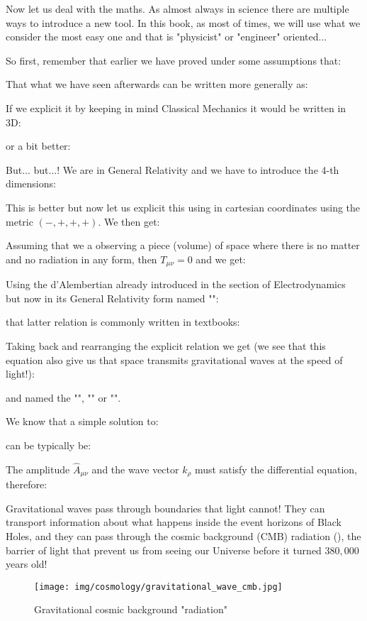 	Now let us deal with the maths. As almost always in science there are multiple ways to introduce a new tool. In this book, as most of times, we will use what we consider the most easy one and that is "physicist" or "engineer" oriented...
	
	So first, remember that earlier we have proved under some assumptions that:
	
	That what we have seen afterwards can be written more generally as:
	
	If we explicit it by keeping in mind Classical Mechanics it would be written in 3D:
	
	or a bit better:
	
	But... but...! We are in General Relativity and we have to introduce the 4-th dimensions:
	
	This is better but now let us explicit this using in cartesian coordinates using the metric $(-, +, +, +)$. We then get:
	
	Assuming that we a observing a piece (volume) of space where there is no matter and no radiation in any form, then $T_{\mu\nu}=0$ and we get:
	
	Using the d'Alembertian already introduced in the section of Electrodynamics but now in its General Relativity form named "":
	
	that latter relation is commonly written in textbooks:
	
	Taking back and rearranging the explicit relation we get (we see that this equation also give us that space transmits gravitational waves at the speed of light!):
	
	and named the "", "" or "".
	
	We know that a simple solution to:
	
	can be typically be:
	
	The amplitude $\hat{A}_{\mu\nu}$ and the wave vector $k_\rho$ must satisfy the differential equation, therefore:
	
	
	Gravitational waves pass through boundaries that light cannot! They can transport information about what happens inside the event horizons of Black Holes, and they can pass through the cosmic background (CMB) radiation (), the barrier of light that prevent us from seeing our Universe before it turned $380,000$ years old!
	\begin{figure}[H]
		\centering
		\texttt{[image: img/cosmology/gravitational\_wave\_cmb.jpg]}	
		\caption{Gravitational cosmic background "radiation"}
	\end{figure}
	
